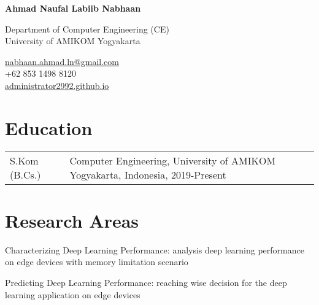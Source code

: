 \documentclass[12pt,letterpaper]{report}
\newcommand{\myname}{Ahmad Naufal Labiib Nabhaan}
\newcommand{\namefont}[1]{{\normalfont\bfseries\Huge{#1}}}
\newcommand{\listitemspace}{0.25em}
\renewenvironment{itemize}
{\begin{list}{}{\setlength{\leftmargin}{0em}
                \setlength{\parskip}{0em}
                \setlength{\itemsep}{\listitemspace}
                \setlength{\parsep}{\listitemspace}}}
{\end{list}}
\begin{document}
    \raggedright{}

    \namefont{\myname}

    \vspace{1em}
    \begin{minipage}[t]{0.700\textwidth}
        Department of Computer Engineering (CE)\\
        University of AMIKOM Yogyakarta
    \end{minipage}
    \begin{minipage}[t]{0.295\textwidth}
        \flushright{}
        \href{mailto:nabhaan.ahmad.ln@gmail.com}{nabhaan.ahmad.ln@gmail.com} \\
        +62 853 1498 8120 \\
        \href{https://administrator2992.github.io}{administrator2992.github.io}
    \end{minipage}

    \section*{Education}

    \begin{tabular}{@{}p{}p{}}
        S.Kom (B.Cs.) & Computer Engineering, University of AMIKOM Yogyakarta, Indonesia, 2019-Present \\
    \end{tabular}
    
    \section*{Research Areas}
    \begin{itemize}
      \item Characterizing Deep Learning Performance: analysis deep learning performance on edge devices with memory limitation scenario
      \item Predicting Deep Learning Performance: reaching wise decision for the deep learning application on edge devices
    \end{itemize}
    
\end{document}
